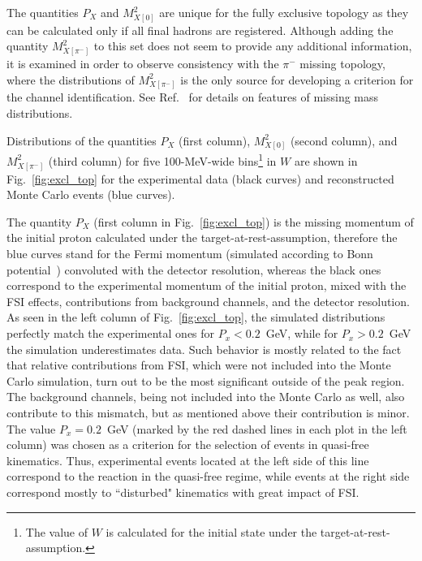 The quantities $P_{X}$ and $M^{2}_{X[0]}$ are unique for the fully exclusive topology as they can be calculated only if all final hadrons are registered. Although adding the quantity $M_{X[\pi^{-}]}^{2}$ to this set does not seem to provide any additional information, it is examined in order to observe consistency with the $\pi^{-}$ missing topology, where the distributions of $M_{X[\pi^{-}]}^{2}$ is the only source for developing a criterion for the channel identification. See Ref.~\cite{note_mm_distr} for details on features of missing mass distributions.

Distributions of the quantities $P_{X}$ (first column), $M^{2}_{X[0]}$ (second column), and $M_{X[\pi^{-}]}^{2}$ (third column) for five 100-MeV-wide bins\footnote[11]{The value of $W$ is calculated for the initial state under the target-at-rest-assumption.} in $W$ are shown in Fig.~\ref{fig:excl_top} for the experimental data (black curves) and reconstructed Monte Carlo events (blue curves).


The quantity $P_{X}$ (first column in Fig.~\ref{fig:excl_top}) is the missing momentum of the initial proton calculated under the target-at-rest-assumption, therefore the blue curves stand for the Fermi momentum (simulated according to Bonn potential~\cite{Machleidt:1987hj}) convoluted with the detector resolution, whereas the black ones correspond to the experimental momentum of the initial proton, mixed with the FSI effects, contributions from background channels, and the detector resolution. As seen in the left column of Fig.~\ref{fig:excl_top}, the simulated distributions perfectly match the experimental ones for $P_{x} < 0.2$~GeV, while for $P_{x} > 0.2$~GeV the simulation underestimates data. Such behavior is mostly related to the fact that relative contributions from FSI, which were not included into the Monte Carlo simulation, turn out to be the most significant outside of the peak region. The background channels, being not included into the Monte Carlo as well, also contribute to this mismatch, but as mentioned above their contribution is minor.
The value  $P_{x} = 0.2$~GeV (marked by the red dashed lines in each plot in the left column) was chosen as a criterion for the selection of events in quasi-free kinematics. Thus, experimental events located at the left side of this line correspond to the reaction in the quasi-free regime, while events at the right side correspond mostly to ``disturbed" kinematics with great impact of FSI.

